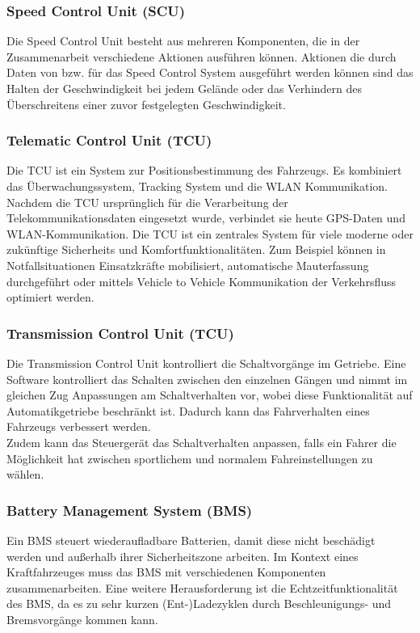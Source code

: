         \subsubsection{Speed Control Unit (SCU)}
        Die Speed Control Unit besteht aus mehreren Komponenten, die in der Zusammenarbeit
        verschiedene Aktionen ausführen können. Aktionen die durch Daten von bzw. für das Speed Control System ausgeführt
        werden können sind das Halten der Geschwindigkeit bei jedem Gelände oder das Verhindern des Überschreitens einer zuvor festgelegten
        Geschwindigkeit.
        \cite{SCU.PB1}

        \subsubsection{Telematic Control Unit (TCU)}
        Die TCU ist ein System zur Positionsbestimmung des Fahrzeugs. 
        Es kombiniert das Überwachungssystem, Tracking System und die WLAN Kommunikation. 
        Nachdem die TCU ursprünglich für die Verarbeitung der Telekommunikationsdaten eingesetzt wurde, 
        verbindet sie heute GPS-Daten und WLAN-Kommunikation.
        Die TCU ist ein zentrales System für viele moderne oder zukünftige Sicherheits und Komfortfunktionalitäten. Zum Beispiel
        können in Notfallsituationen Einsatzkräfte mobilisiert, automatische Mauterfassung durchgeführt oder mittels Vehicle to Vehicle
        Kommunikation der Verkehrsfluss optimiert werden. 
        \cite{telematiccontrol.PB1} \cite{telematiccontrol.PB2} \cite{telematiccontrol.PB3}

        \subsubsection{Transmission Control Unit (TCU)}
        Die Transmission Control Unit kontrolliert die Schaltvorgänge im Getriebe. Eine Software kontrolliert das Schalten
        zwischen den einzelnen Gängen und nimmt im gleichen Zug Anpassungen am Schaltverhalten vor, 
        wobei diese Funktionalität auf Automatikgetriebe beschränkt ist. Dadurch kann
         das Fahrverhalten eines Fahrzeugs verbessert werden.\\
        Zudem kann das Steuergerät das Schaltverhalten anpassen, falls ein Fahrer die Möglichkeit
         hat zwischen sportlichem und normalem Fahreinstellungen zu wählen.
        \cite{transmissioncontrol.PB1} \cite{transmissioncontrol.PB2}

        \subsubsection{Battery Management System (BMS)}
        Ein BMS steuert wiederaufladbare Batterien, damit diese nicht beschädigt werden und außerhalb ihrer
        Sicherheitszone arbeiten. Im Kontext eines Kraftfahrzeuges muss das BMS mit verschiedenen Komponenten
        zusammenarbeiten. Eine weitere Herausforderung ist die Echtzeitfunktionalität des BMS, da es zu sehr kurzen (Ent-)Ladezyklen durch Beschleunigungs-
        und Bremsvorgänge kommen kann.
        \cite{BMS.PB1} \cite{BMS.PB2}

